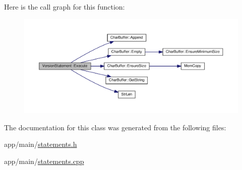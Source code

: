 Here is the call graph for this function\+:\nopagebreak
\begin{figure}[H]
\begin{center}
\leavevmode
\includegraphics[width=350pt]{classVersionStatement_a0601a810472862583ef4c702c6f1fd0a_cgraph}
\end{center}
\end{figure}




The documentation for this class was generated from the following files\+:\begin{DoxyCompactItemize}
\item 
app/main/\hyperlink{statements_8h}{statements.\+h}\item 
app/main/\hyperlink{statements_8cpp}{statements.\+cpp}\end{DoxyCompactItemize}
